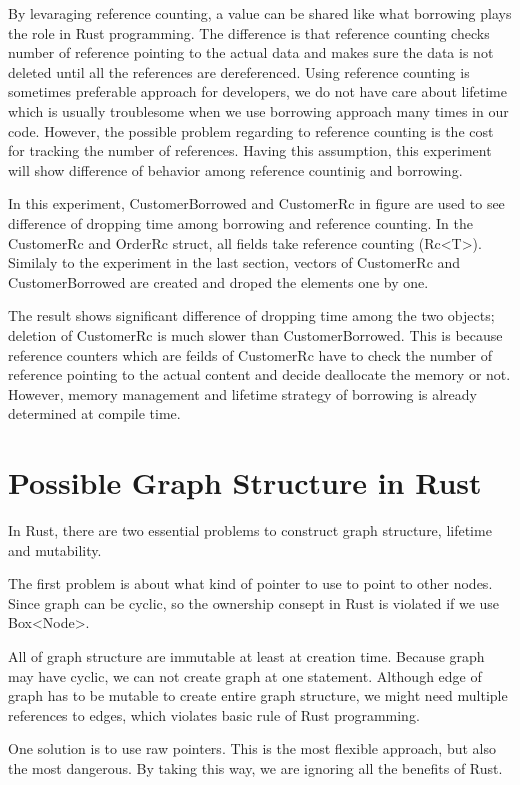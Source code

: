 By levaraging reference counting, a value can be shared like what borrowing plays the role in Rust programming. 
The difference is that reference counting checks number of reference pointing to the actual data and makes sure the data is not deleted 
until all the references are dereferenced. Using reference counting is sometimes preferable approach for developers, 
we do not have care about lifetime which is usually troublesome when we use borrowing approach many times in our code. 
However, the possible problem regarding to reference counting is the cost for tracking the number of references. 
Having this assumption, this experiment will show difference of behavior among reference countinig and borrowing.

In this experiment, CustomerBorrowed and CustomerRc in figure are used to see difference of dropping time among borrowing and reference counting. 
In the CustomerRc and OrderRc struct, all fields take reference counting (Rc<T>). Similaly to the experiment in the last section, 
vectors of CustomerRc and CustomerBorrowed are created and droped the elements one by one. 

The result shows significant difference of dropping time among the two objects; deletion of CustomerRc is much slower than CustomerBorrowed. 
This is because reference counters which are feilds of CustomerRc have to check the number of reference pointing to the actual content and decide 
deallocate the memory or not. However, memory management and lifetime strategy of borrowing is already determined at compile time.



\section{Possible Graph Structure in Rust}
\label{sec:history}
In Rust, there are two essential problems to construct graph structure, lifetime and mutability. 

The first problem is about what kind of pointer to use to point to other nodes. 
Since graph can be cyclic, so the ownership consept in Rust is violated if we use Box<Node>.

All of graph structure are immutable at least at creation time. Because graph may have cyclic, 
we can not create graph at one statement. Although edge of graph has to be mutable to create entire graph structure, 
we might need multiple references to edges, which violates basic rule of Rust programming.

One solution is to use raw pointers. This is the most flexible approach, but also the most dangerous. 
By taking this way, we are ignoring all the benefits of Rust.



